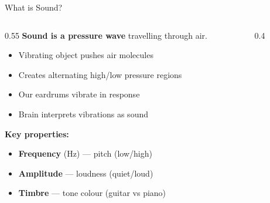 \documentclass[aspectratio=169,12pt]{beamer}
\begin{document}
\begin{frame}{What is Sound?}
    \begin{columns}
        \begin{column}{0.55\textwidth}
            \textbf{Sound is a pressure wave} travelling through air.
            \begin{itemize}
                \item Vibrating object pushes air molecules
                \item Creates alternating high/low pressure regions
                \item Our eardrums vibrate in response
                \item Brain interprets vibrations as sound
            \end{itemize}
            
            \vspace{0.3cm}
            \textbf{Key properties:}
            \begin{itemize}
                \item \textbf{Frequency} (Hz) --- pitch (low/high)
                \item \textbf{Amplitude} --- loudness (quiet/loud)
                \item \textbf{Timbre} --- tone colour (guitar vs piano)
            \end{itemize}
        \end{column}
        \begin{column}{0.4\textwidth}
            \begin{center}
            \end{center}
        \end{column}
    \end{columns}
\end{frame}
\end{document}
